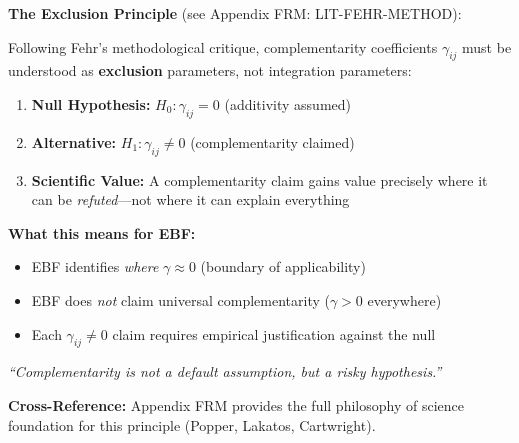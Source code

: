 \begin{tcolorbox}[colback=red!5!white, colframe=red!75!black,
    title=\textbf{Methodological Principle: $\gamma = 0$ as Null Hypothesis}]

\textbf{The Exclusion Principle} (see Appendix FRM: LIT-FEHR-METHOD):

Following Fehr's methodological critique, complementarity coefficients $\gamma_{ij}$
must be understood as \textbf{exclusion} parameters, not integration parameters:

\begin{enumerate}[noitemsep]
    \item \textbf{Null Hypothesis:} $H_0: \gamma_{ij} = 0$ (additivity assumed)
    \item \textbf{Alternative:} $H_1: \gamma_{ij} \neq 0$ (complementarity claimed)
    \item \textbf{Scientific Value:} A complementarity claim gains value precisely
          where it can be \textit{refuted}---not where it can explain everything
\end{enumerate}

\textbf{What this means for EBF:}
\begin{itemize}[noitemsep]
    \item EBF identifies \textit{where} $\gamma \approx 0$ (boundary of applicability)
    \item EBF does \textit{not} claim universal complementarity ($\gamma > 0$ everywhere)
    \item Each $\gamma_{ij} \neq 0$ claim requires empirical justification against the null
\end{itemize}

\textit{``Complementarity is not a default assumption, but a risky hypothesis.''}

\textbf{Cross-Reference:} Appendix FRM provides the full philosophy of science
foundation for this principle (Popper, Lakatos, Cartwright).

\end{tcolorbox}



